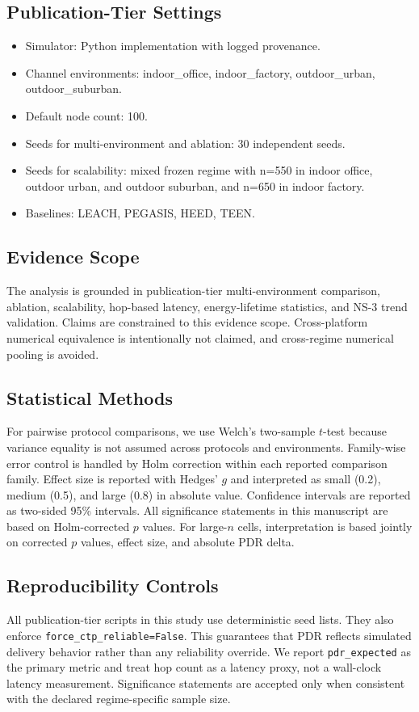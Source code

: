 \documentclass[sensors,article,submit,moreauthors,pdftex]{Definitions/mdpi}
\begin{document}
\subsection{Publication-Tier Settings}
\begin{itemize}
\item Simulator: Python implementation with logged provenance.
\item Channel environments: indoor\_office, indoor\_factory, outdoor\_urban, outdoor\_suburban.
\item Default node count: 100.
\item Seeds for multi-environment and ablation: 30 independent seeds.
\item Seeds for scalability: mixed frozen regime with n=550 in indoor office, outdoor urban, and outdoor suburban, and n=650 in indoor factory.
\item Baselines: LEACH, PEGASIS, HEED, TEEN.
\end{itemize}

\subsection{Evidence Scope}
The analysis is grounded in publication-tier multi-environment comparison, ablation, scalability, hop-based latency, energy-lifetime statistics, and NS-3 trend validation. Claims are constrained to this evidence scope. Cross-platform numerical equivalence is intentionally not claimed, and cross-regime numerical pooling is avoided.

\subsection{Statistical Methods}
For pairwise protocol comparisons, we use Welch's two-sample $t$-test because variance equality is not assumed across protocols and environments. Family-wise error control is handled by Holm correction within each reported comparison family. Effect size is reported with Hedges' $g$ and interpreted as small (0.2), medium (0.5), and large (0.8) in absolute value. Confidence intervals are reported as two-sided 95\% intervals. All significance statements in this manuscript are based on Holm-corrected $p$ values. For large-$n$ cells, interpretation is based jointly on corrected $p$ values, effect size, and absolute PDR delta.

\subsection{Reproducibility Controls}
All publication-tier scripts in this study use deterministic seed lists. They also enforce \texttt{force\_ctp\_reliable=False}. This guarantees that PDR reflects simulated delivery behavior rather than any reliability override. We report \texttt{pdr\_expected} as the primary metric and treat hop count as a latency proxy, not a wall-clock latency measurement. Significance statements are accepted only when consistent with the declared regime-specific sample size.
\end{document}

